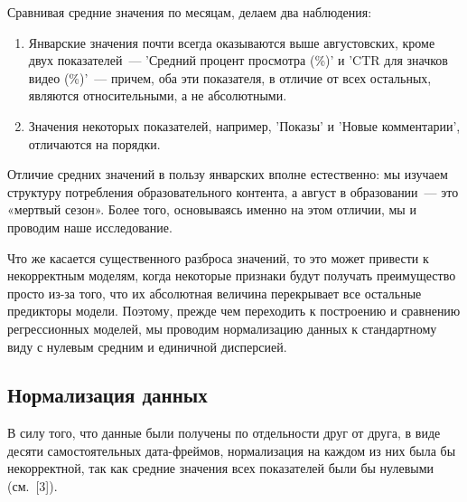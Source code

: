 \documentclass[a4paper,12pt]{article}
\begin{document}
\noindent
Сравнивая средние значения по месяцам, делаем два наблюдения:
\medskip
\begin{enumerate}
	\item Январские значения почти всегда оказываются выше августовских, кроме двух показателей~--- 'Средний процент просмотра (\%)' и 'CTR для значков видео (\%)'~--- причем, оба эти показателя, в отличие от всех остальных, являются относительными, а не абсолютными.
	\item Значения некоторых показателей, например, 'Показы' и 'Новые комментарии', отличаются на порядки.
\end{enumerate}
\medskip
Отличие средних значений в пользу январских вполне естественно: мы изучаем структуру потребления образовательного контента, а август в образовании — это «мертвый сезон». Более того, основываясь именно на этом отличии, мы и проводим наше исследование. 

Что же касается существенного разброса значений, то это может привести к некорректным моделям, когда некоторые признаки будут получать преимущество просто из-за того, что их абсолютная величина перекрывает все остальные предикторы модели. Поэтому, прежде чем переходить к построению и сравнению регрессионных моделей, мы проводим нормализацию данных к стандартному виду с нулевым средним и единичной дисперсией.

\subsection{Нормализация данных}
В силу того, что данные были получены по отдельности друг от друга, в виде десяти самостоятельных дата-фреймов, нормализация на каждом из них была бы некорректной, так как средние значения всех показателей были бы нулевыми (см. [3]).
 
\end{document}
